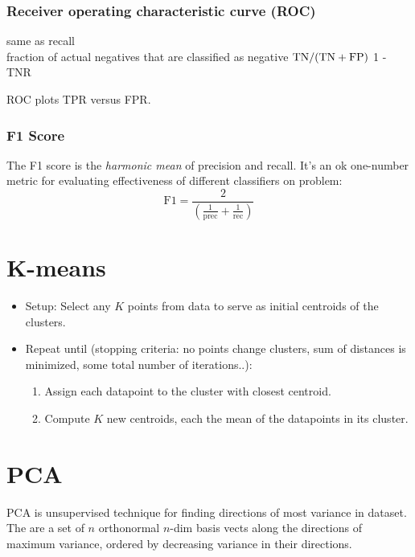 \documentclass[11pt]{article}
\begin{document}
\subsubsection{Receiver operating characteristic curve (ROC)}
 same as recall \\
 fraction of actual negatives that are classified as
negative $\textrm{TN}/(\textrm{TN} + \textrm{FP})$
 1 - TNR

ROC plots TPR versus FPR.


\subsubsection{F1 Score}
The F1 score is the \emph{harmonic mean} of precision and recall. It's an ok one-number
metric for evaluating effectiveness of different classifiers on problem:
\begin{equation}
  \label{eq:F1}
  \textrm{F1} = \frac{2}{\left(\frac{1}{\textrm{prec}} + \frac{1}{\textrm{rec}}\right)}
\end{equation}



\section{K-means}
\label{sec:kmeans}
\begin{itemize}
  \item Setup: Select any $K$ points from data to serve as initial centroids of the
  clusters.
  \item Repeat until (stopping criteria: \eeg no points change clusters, sum of
  distances is minimized, some total number of iterations..):
  \begin{enumerate}
    \item Assign each datapoint to the cluster with closest centroid.
    \item Compute $K$ new centroids, each the mean of the datapoints in its cluster.
  \end{enumerate}
\end{itemize}



\section{PCA}
\label{sec:pca}
PCA is unsupervised technique for finding directions of most variance in dataset. The
 are a set of $n$ orthonormal $n$-dim basis vects along the
directions of maximum variance, ordered by decreasing variance in their directions.
\end{document}
